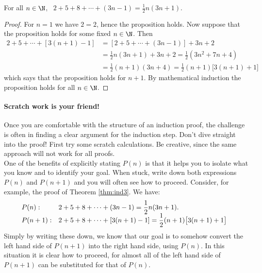 \begin{thm}\label{thm:ind3}
For all $n\in\N$, \ $2+5+8+\cdots+(3n-1)=\frac 12n(3n+1)$.
\end{thm}

\begin{proof}
For $n=1$ we have $2=2$, hence the proposition holds. Now suppose that the proposition holds for some fixed $n\in\N$. Then
\begin{align*}
2+5+\cdots+[3(n+1)-1]&=\left[2+5+\cdots+(3n-1)\right]+3n+2\\
&=\frac 12n(3n+1)+3n+2=\frac 12(3n^2+7n+4)\\
&=\frac 12(n+1)(3n+4)=\frac 12(n+1)\bigl[3(n+1)+1\bigr]
\end{align*}
which says that the proposition holds for $n+1$. By mathematical induction the proposition holds for all $n\in\N$.
\end{proof}

\paragraph{Scratch work is your friend!}

Once you are comfortable with the structure of an induction proof, the challenge is often in finding a clear argument for the induction step. Don't dive straight into the proof! First try some scratch calculations. Be creative, since the same approach will not work for all proofs.\\
One of the benefits of explicitly stating $P(n)$ is that it helps you to isolate what you know and to identify your goal. When stuck, write down both expressions $P(n)$ and $P(n+1)$ and you will often see how to proceed. Consider, for example, the proof of Theorem \ref{thm:ind3}. We have:
\begin{gather*}
\begin{array}{@{}l@{}l}
P(n):&\displaystyle 2+5+8+\cdots+(3n-1)=\frac 12n(3n+1).\\[-1pt]
P(n+1):\quad &\displaystyle 2+5+8+\cdots+[3(n+1)-1]=\frac 12(n+1)\bigl[3(n+1)+1\bigr]
\end{array}
\end{gather*}
Simply by writing these down, we know that our goal is to somehow convert the left hand side of $P(n+1)$ into the right hand side, using $P(n)$. In this situation it is clear how to proceed, for almost all of the left hand side of $P(n+1)$ can be substituted for that of $P(n)$.\\

